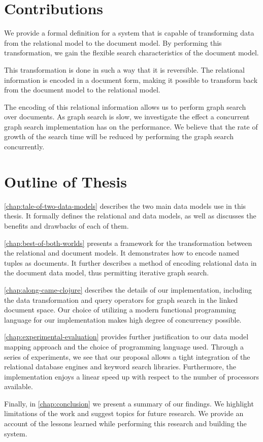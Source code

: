 	 \section{Contributions}
	 	We provide a formal definition for a system that is capable of transforming data from the relational model to the document model.  By performing this transformation, we gain the flexible search characteristics of the document model.
	 	
	 	This transformation is done in such a way that it is reversible.  The relational information is encoded in a document form, making it possible to transform back from the document model to the relational model.
	 	
	 	The encoding of this relational information allows us to perform graph search over documents.  As graph search is slow, we investigate the effect a concurrent graph search implementation has on the performance.  We believe that the rate of growth of the search time will be reduced by performing the graph search concurrently.
	
	\section{Outline of Thesis}
		\cref{chap:tale-of-two-data-models} describes the two main data models use in this thesis.  It formally defines the relational and data models, as well as discusses the benefits and drawbacks of each of them.
		
		\cref{chap:best-of-both-worlds} presents a framework for the transformation between the relational and document models.  It demonstrates how to encode named tuples as documents.  It further describes a method of encoding relational data in the document data model, thus permitting iterative graph search.
		
		\cref{chap:along-came-clojure} describes the details of our implementation, including the data transformation and query operators for graph search in the linked document space.  Our choice of utilizing a modern functional programming language for our implementation makes high degree of concurrency possible.
		
		\cref{chap:experimental-evaluation} provides further justification to our data model mapping approach and the choice of programming language used.  Through a series of experiments, we see that our proposal allows a tight integration of the relational database engines and keyword search libraries.  Furthermore, the implementation enjoys a linear speed up with respect to the number of processors available.
		
		Finally, in \cref{chap:conclusion} we present a summary of our findings.  We highlight limitations of the work and suggest topics for future research.  We provide an account of the lessons learned while performing this research and building the system.